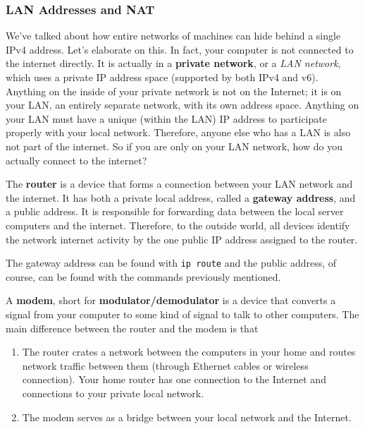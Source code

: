 \documentclass{article}
\begin{document}
    \subsubsection{LAN Addresses and NAT} 

      We've talked about how entire networks of machines can hide behind a single IPv4 address. Let's elaborate on this. In fact, your computer is not connected to the internet directly. It is actually in a \textbf{private network}, or a \textit{LAN network}, which uses a private IP address space (supported by both IPv4 and v6). Anything on the inside of your private network is not on the Internet; it is on your LAN, an entirely separate network, with its own address space. Anything on your LAN must have a unique (within the LAN) IP address to participate properly with your local network. Therefore, anyone else who has a LAN is also not part of the internet. So if you are only on your LAN network, how do you actually connect to the internet? 

      \begin{definition}[Router] 
        The \textbf{router} is a device that forms a connection between your LAN network and the internet. It has both a private local address, called a \textbf{gateway address}, and a public address. It is responsible for forwarding data between the local server computers and the internet. Therefore, to the outside world, all devices identify the network internet activity by the one public IP address assigned to the router. 

        The gateway address can be found with \texttt{ip route} and the public address, of course, can be found with the commands previously mentioned. 
      \end{definition}

      \begin{definition}[Modem]
        A \textbf{modem}, short for \textbf{modulator/demodulator} is a device that converts a signal from your computer to some kind of signal to talk to other computers. The main difference between the router and the modem is that 
        \begin{enumerate} 
           \item The router crates a network between the computers in your home and routes network traffic between them (through Ethernet cables or wireless connection). Your home router has one connection to the Internet and connections to your private local network. 

          \item The modem serves as a bridge between your local network and the Internet.  
        \end{enumerate}
      \end{definition}
\end{document}
